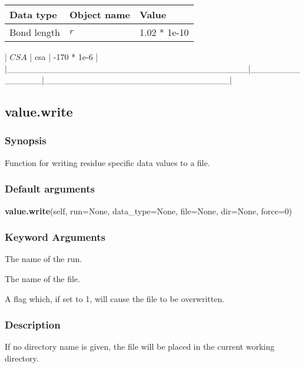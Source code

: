 \begin{center}
\begin{tabular}{lll}
\toprule
Data type & Object name & Value \\
\midrule
 Bond length                            &  $r$             &  1.02 * 1e-10                  \\
\bottomrule
\end{tabular}
\end{center}

| $CSA$                                   | csa          | -170 * 1e-6                  |
|\_\_\_\_\_\_\_\_\_\_\_\_\_\_\_\_\_\_\_\_\_\_\_\_\_\_\_\_\_\_\_\_\_\_\_\_\_\_\_|\_\_\_\_\_\_\_\_\_\_\_\_\_\_|\_\_\_\_\_\_\_\_\_\_\_\_\_\_\_\_\_\_\_\_\_\_\_\_\_\_\_\_\_\_|


\newpage

\subsection{value.write}


\subsubsection{Synopsis}

Function for writing residue specific data values to a file.

\subsubsection{Default arguments}

\textsf{\textbf{value.write}(self, run=None, data\_type=None, file=None, dir=None, force=0)}


\subsubsection{Keyword Arguments}

  The name of the run.

  The name of the file.

  A flag which, if set to 1, will cause the file to be overwritten.

\subsubsection{Description}

If no directory name is given, the file will be placed in the current working directory.

